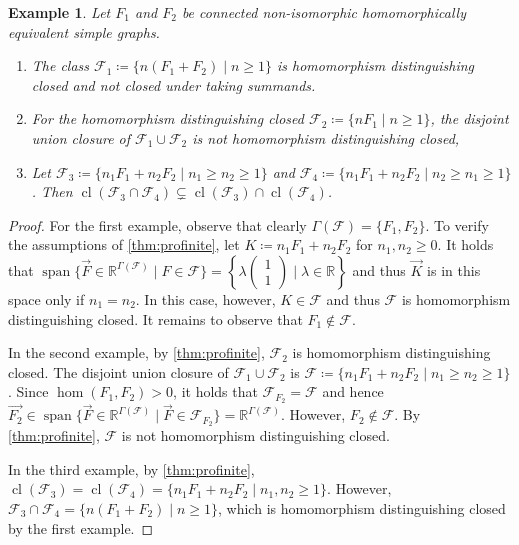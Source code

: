 \documentclass[3p,final]{elsarticle}
\DeclareMathOperator{\spn}{span}
\DeclareMathOperator{\cl}{cl}
\newtheorem{example}[theorem]{Example}
\begin{document}
	\begin{example} \label{ex1} \label{ex:union}
		Let $F_1$ and $F_2$ be connected non-isomorphic homomorphically equivalent simple graphs.
		\begin{enumerate}
			\item The class $\mathcal{F}_1 \coloneqq \{n(F_1 + F_2) \mid n \geq 1\}$ is homomorphism distinguishing closed and not closed under taking summands.
			\item For the homomorphism distinguishing closed $\mathcal{F}_2 \coloneqq \{n F_1 \mid n \geq 1\}$, 
			the disjoint union closure of  $\mathcal{F}_1 \cup \mathcal{F}_2$ is not homomorphism distinguishing closed,
			\item Let $\mathcal{F}_3 \coloneqq \{n_1F_1 + n_2F_2 \mid n_1 \geq n_2 \geq 1\}$ and $\mathcal{F}_4 \coloneqq \{n_1F_1 + n_2F_2 \mid n_2 \geq n_1 \geq 1\}$.
			Then $\cl(\mathcal{F}_3 \cap \mathcal{F}_4) \subsetneq \cl(\mathcal{F}_3) \cap \cl(\mathcal{F}_4)$.
		\end{enumerate}
	\end{example}
	\begin{proof}For the first example, observe that clearly $\Gamma(\mathcal{F}) = \{F_1, F_2\}$.
		To verify the assumptions of \cref{thm:profinite}, let $K \coloneqq n_1 F_1 + n_2 F_2$ for $n_1, n_2 \geq 0$. 
		It holds that $\spn\{\vec{F} \in \mathbb{R}^{\Gamma(\mathcal{F})} \mid F \in \mathcal{F}\} = \left\{ \lambda \left( \begin{smallmatrix}
			1\\1
		\end{smallmatrix} \right) \mid \lambda \in \mathbb{R} \right\}$ and thus $\vec{K}$ is in this space only if $n_1 = n_2$. In this case, however, $K \in \mathcal{F}$ and thus $\mathcal{F}$ is homomorphism distinguishing closed. It remains to observe that $F_1 \not\in \mathcal{F}$.
		
		In the second example, by \cref{thm:profinite}, $\mathcal{F}_2$ is homomorphism distinguishing closed. 
		The disjoint union closure of $\mathcal{F}_1 \cup \mathcal{F}_2$ is $\mathcal{F} \coloneqq \{n_1 F_1 + n_2 F_2 \mid n_1 \geq n_2 \geq 1\}$.
		Since $\hom(F_1, F_2) > 0$, it holds that $\mathcal{F}_{F_2} = \mathcal{F}$ and hence $\vec{F_2} \in \spn\{\vec{F} \in \mathbb{R}^{\Gamma(\mathcal{F})} \mid \vec{F} \in \mathcal{F}_{F_2}\} = \mathbb{R}^{\Gamma(\mathcal{F})}$. However, $F_2 \not\in \mathcal{F}$. By \cref{thm:profinite}, $\mathcal{F}$ is not homomorphism distinguishing closed.
		
		In the third example, by \cref{thm:profinite}, $\cl(\mathcal{F}_3) = \cl(\mathcal{F}_4) = \{n_1F_1 + n_2F_2 \mid n_1, n_2 \geq 1\}$.
		However, $\mathcal{F}_3 \cap \mathcal{F}_4 = \{n(F_1 + F_2) \mid n \geq 1\}$, which is homomorphism distinguishing closed by the first example.
	\end{proof}
\end{document}
